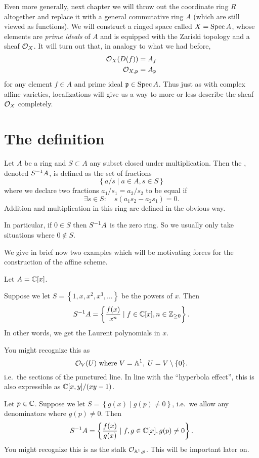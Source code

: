 Even more generally,
next chapter we will throw out the coordinate ring $R$
altogether and replace it with a general commutative ring $A$
(which are still viewed as functions).
We will construct a ringed space called $X = \operatorname{Spec} A$,
whose elements are \emph{prime ideals} of $A$
and is equipped with the Zariski topology and a sheaf $\mathcal O_X$.
It will turn out that, in analogy to what we had before,
\begin{align*}
	\mathcal O_X(D(f)) &= A_f \\
	\mathcal O_{X,\mathfrak p} &= A_\mathfrak p
\end{align*}
for any element $f \in A$ and prime ideal $\mathfrak p \in \operatorname{Spec} A$.
Thus just as with complex affine varieties,
localizations will give us a way to more or less
describe the sheaf $\mathcal O_X$ completely.

\section{The definition}
\begin{definition}
	Let $A$ be a ring and $S \subset A$ any subset
	closed under multiplication.
	Then the , denoted $S^{-1} A$,
	is defined as the set of fractions
	\[ \left\{ a/s \mid a \in A, s \in S \right\} \]
	where we declare two fractions $a_1 / s_1 = a_2 / s_2$ 
	to be equal if
	\[ \exists s \in S : \quad s(a_1s_2 - a_2s_1) = 0. \]
	Addition and multiplication in this ring
	are defined in the obvious way.
\end{definition}
In particular, if $0 \in S$ then $S^{-1} A$ is the zero ring.
So we usually only take situations where $0 \notin S$.

We give in brief now two examples which will be
motivating forces for the construction of the affine scheme.
\begin{example}
	[Localizations of {$\CC[x]$}]
	Let $A = \mathbb C[x]$.
	\begin{enumerate}[(a)]
		\ii Suppose we let $S = \left\{ 1, x, x^2, x^3, \dots \right\}$
		be the powers of $x$.
		Then
		\[ S^{-1} A = \left\{ \frac{f(x)}{x^n}
			\mid f \in \mathbb C[x], n \in \mathbb Z_{\ge 0} \right\}.  \]
		In other words, we get the Laurent polynomials in $x$.

		You might recognize this as
		\[ \mathcal O_V(U) \text{ where } V = \mathbb A^1, \; U = V \setminus \{0\}. \]
		i.e.\ the sections of the punctured line.
		In line with the ``hyperbola effect'',
		this is also expressible as $\mathbb C[x,y] / (xy-1)$.

		\ii Let $p \in \mathbb C$.
		Suppose we let $S = \left\{ g(x) \mid g(p) \ne 0 \right\}$,
		i.e.\ we allow any denominators where $g(p) \ne 0$.
		Then
		\[ S^{-1} A = \left\{ \frac{f(x)}{g(x)}
			\mid f,g \in \mathbb C[x], g(p) \ne 0 \right\}.  \]
		You might recognize this is as the stalk $\mathcal O_{\mathbb A^1, p}$.
		This will be important later on.
	\end{enumerate}
\end{example}


